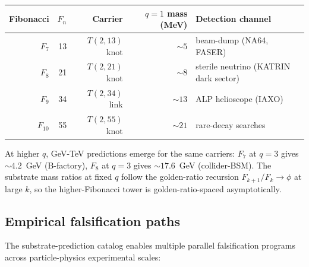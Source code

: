 \documentclass[11pt]{article}
\begin{document}
\begin{center}
\begin{tabular}{rrrrl}
\toprule
Fibonacci & $F_n$ & Carrier & $q = 1$ mass (MeV) & Detection channel \\
\midrule
$F_7$  & 13 & $T(2, 13)$ knot & $\sim 5$   & beam-dump (NA64, FASER) \\
$F_8$  & 21 & $T(2, 21)$ knot & $\sim 8$   & sterile neutrino (KATRIN dark sector) \\
$F_9$  & 34 & $T(2, 34)$ link & $\sim 13$  & ALP helioscope (IAXO) \\
$F_{10}$ & 55 & $T(2, 55)$ knot & $\sim 21$  & rare-decay searches \\
\bottomrule
\end{tabular}
\end{center}

At higher $q$, GeV-TeV predictions emerge for the same carriers: $F_7$ at $q = 3$ gives $\sim 4.2$~GeV (B-factory), $F_8$ at $q = 3$ gives $\sim 17.6$~GeV (collider-BSM).  The substrate mass ratios at fixed $q$ follow the golden-ratio recursion $F_{k + 1} / F_k \to \phi$ at large $k$, so the higher-Fibonacci tower is golden-ratio-spaced asymptotically.

\subsection{Empirical falsification paths}
\label{sec:falsification-paths}

The substrate-prediction catalog enables multiple parallel falsification programs across particle-physics experimental scales:
\end{document}
